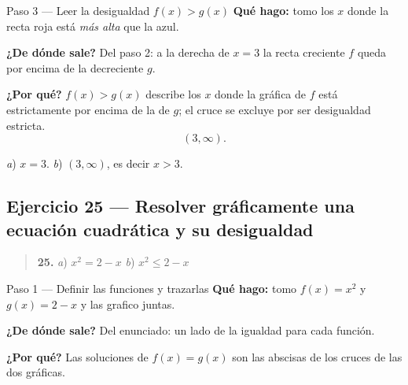 \documentclass[11pt]{article}
\begin{document}
\begin{paso}{Paso 3 --- Leer la desigualdad $f(x)>g(x)$}
\textbf{Qué hago:} tomo los $x$ donde la recta roja está \emph{más alta} que la azul.

\textbf{¿De dónde sale?} Del paso 2: a la derecha de $x=3$ la recta creciente $f$ queda por encima de la decreciente $g$.

\textbf{¿Por qué?} $f(x)>g(x)$ describe los $x$ donde la gráfica de $f$ está estrictamente por encima de la de $g$; el cruce se excluye por ser desigualdad estricta.
\[
(3,\infty).
\]
\end{paso}

\begin{resp}
\emph{a}) $x=3$. \quad \emph{b}) $(3,\infty)$, es decir $x>3$.
\end{resp}

\subsection*{Ejercicio 25 — Resolver gráficamente una ecuación cuadrática y su desigualdad}

\begin{quote}
\textbf{25.} \emph{a}) $x^2=2-x$ \hfill \emph{b}) $x^2\le 2-x$
\end{quote}

\begin{paso}{Paso 1 --- Definir las funciones y trazarlas}
\textbf{Qué hago:} tomo $f(x)=x^2$ y $g(x)=2-x$ y las grafico juntas.

\textbf{¿De dónde sale?} Del enunciado: un lado de la igualdad para cada función.

\textbf{¿Por qué?} Las soluciones de $f(x)=g(x)$ son las abscisas de los cruces de las dos gráficas.
\begin{center}
\end{center}
\end{paso}
\end{document}
